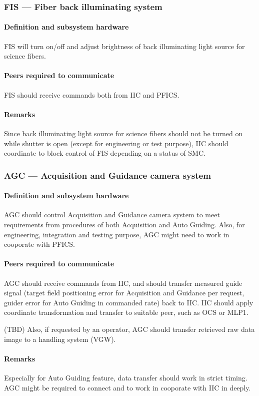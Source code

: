 \documentclass[a4paper,notitlepage]{article}
\begin{document}
\subsubsection{FIS --- Fiber back illuminating system}
\paragraph{Definition and subsystem hardware}
FIS will turn on/off and adjust brightness of back illuminating light source 
for science fibers. 
\paragraph{Peers required to communicate}
FIS should receive commands both from IIC and PFICS. 
\paragraph{Remarks}
Since back illuminating light source for science fibers should not be turned 
on while shutter is open (except for engineering or test purpose), IIC should 
coordinate to block control of FIS depending on a status of SMC. 

\subsubsection{AGC --- Acquisition and Guidance camera system}
\paragraph{Definition and subsystem hardware}
AGC should control Acquisition and Guidance camera system to meet 
requirements from procedures of both Acquisition and Auto 
Guiding. 
Also, for engineering, integration and testing purpose, AGC might need to work 
in cooporate with PFICS. 
\paragraph{Peers required to communicate}
AGC should receive commands from IIC, and should transfer measured guide 
signal (target field positioning error for Acquisition and Guidance per 
request, guider error for Auto Guiding in commanded rate) back to IIC. 
IIC should apply coordinate transformation and transfer to suitable peer, 
such as OCS or MLP1. 

(TBD) Also, if requested by an operator, 
AGC should transfer retrieved raw data image to a handling system (VGW). 
\paragraph{Remarks}
Especially for Auto Guiding feature, data transfer should work in strict 
timing. 
AGC might be required to connect and to work in cooporate with IIC in deeply. 
\end{document}

